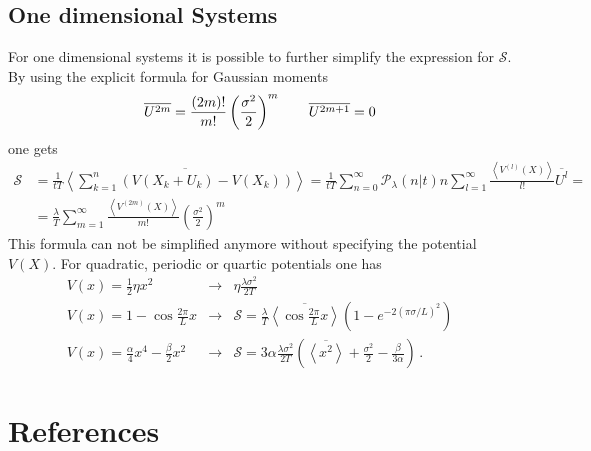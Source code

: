 \documentclass[12pt]{iopart}
\newcommand{\lx} {\left}
\newcommand{\rx} {\right}
\newcommand{\ave}[1] {\lx\langle #1 \rx\rangle}
\newcommand{\cP} {\mathcal{P}}
\newcommand{\cS} {\mathcal{S}}
\begin{document}
\subsection{One dimensional Systems}
For one dimensional systems it is possible to further simplify the expression for $\cS$. By using the explicit formula for Gaussian moments
\begin{equation}
\overline{U^{2m}} = \frac{\lx(2m\rx)!}{m!}\lx(\frac{\sigma^2}{2}\rx)^m \qquad \overline{U^{2m+1}} = 0 \\
\end{equation}
one gets
\begin{align}
\cS &= \frac{1}{tT}\overline{\ave{\sum_{k=1}^n \lx(V(X_k+U_k)-V(X_k)\rx)}} = \frac{1}{tT} \sum_{n=0}^\infty \cP_\lambda(n|t) n \sum_{l=1}^\infty \frac{\ave{V^{(l)}(X)}}{l!}\overline{U^{l}} = \nonumber \\
&=\frac{\lambda}{T}\sum_{m=1}^\infty \frac{\ave{V^{(2m)}(X)}}{m!}\lx(\frac{\sigma^2}{2}\rx)^m
\end{align}
This formula can not be simplified anymore without specifying the potential $V(X)$. For quadratic, periodic or quartic potentials one has
\begin{eqnarray}
    V(x)=\frac{1}{2}\eta x^2 &\rightarrow& \eta\frac{\lambda\sigma^2}{2T}\\
    V(x)=1-\cos{\frac{2\pi}{L}x} &\rightarrow& \cS = \frac{\lambda}{T}\overline{\ave{\cos{\frac{2\pi}{L}x}}} \lx(1-e^{-2\lx(\pi \sigma/L\rx)^2}\rx) \\
    V(x)= \frac{\alpha}{4} x^4-\frac{\beta}{2} x^2 &\rightarrow& \cS = 3\alpha\frac{\lambda\sigma^2}{2T} \lx(\overline{\ave{x^2}}+\frac{\sigma^2}{2}-\frac{\beta}{3\alpha} \rx)\,.
\end{eqnarray}
\section*{References}


\end{document}
